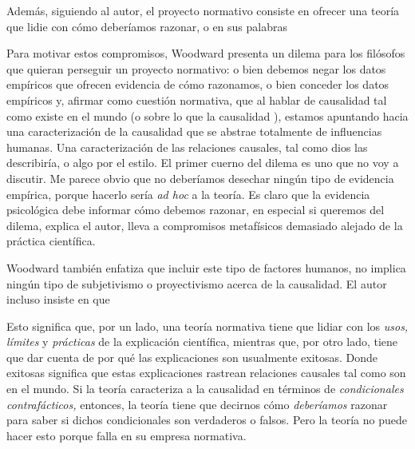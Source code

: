 {{{Además, siguiendo al autor, el proyecto normativo consiste
en ofrecer una teoría que lidie con cómo deberíamos
razonar, o en sus palabras  %

Para motivar estos compromisos, Woodward presenta un dilema para los filósofos que quieran
perseguir un proyecto normativo: o
bien debemos negar los datos empíricos que ofrecen evidencia
de cómo razonamos, o bien conceder los datos empíricos y,
afirmar como cuestión normativa, que al hablar de causalidad
tal como existe en el mundo (o sobre lo que la causalidad
), estamos apuntando hacia una caracterización de la
causalidad que se abstrae totalmente de influencias
humanas. Una caracterización de las relaciones causales,
tal como dios las describiría, o algo por el estilo. El
primer cuerno del dilema es uno que no voy a discutir. Me
parece obvio que no deberíamos desechar ningún tipo de
evidencia empírica, porque hacerlo sería \emph{ad hoc} a la
teoría. Es claro que la evidencia psicológica debe
informar cómo debemos razonar, en especial si queremos
del dilema, explica el autor, lleva a compromisos
metafísicos demasiado alejado de la práctica científica.

Woodward también enfatiza que incluir este tipo de factores
humanos, no implica ningún tipo de subjetivismo o
proyectivismo acerca de la causalidad. El autor incluso
insiste en que 

Esto significa que, por un lado, una teoría normativa tiene
que lidiar con los \emph{usos,} \emph{límites} y
\emph{prácticas} de la explicación científica, mientras que, por otro lado, tiene
que dar cuenta de por qué las explicaciones son usualmente
exitosas. Donde exitosas significa que estas
explicaciones rastrean relaciones causales tal como son en
el mundo. Si la teoría caracteriza a la causalidad en términos
de \emph{condicionales contrafácticos,} entonces, la
teoría tiene que decirnos cómo \emph{deberíamos} razonar
para saber si dichos condicionales son verdaderos o falsos.
Pero la teoría no puede hacer esto porque falla en su
empresa normativa.

}}}
